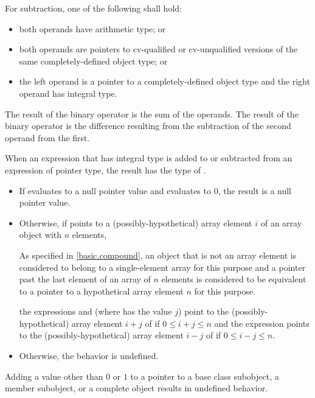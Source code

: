 \pnum
For subtraction, one of the following shall hold:
\begin{itemize}
\item both operands have arithmetic type; or

\item
{}%
both operands are pointers to cv-qualified or cv-unqualified
versions of the same completely-defined object type; or

\item the left operand is a pointer to a completely-defined object type
and the right operand has integral type.
\end{itemize}

\pnum
The result of the binary \tcode{+} operator is the sum of the operands.
The result of the binary \tcode{-} operator is the difference resulting
from the subtraction of the second operand from the first.

\pnum
{}%
When an expression  that has integral type
is added to or subtracted from an expression  of pointer type,
the result has the type of .
\begin{itemize}
\item If  evaluates to a null pointer value and
 evaluates to 0, the result is a null pointer value.
\item Otherwise, if  points to a (possibly-hypothetical) array element $i$
of an array object  with $n$ elements,
\begin{footnote}
As specified in \ref{basic.compound},
an object that is not an array element
is considered to belong to a single-element array for this purpose and
a pointer past the last element of an array of $n$ elements
is considered to be equivalent to a pointer to a hypothetical array element
$n$ for this purpose.
\end{footnote}
the expressions  and 
(where  has the value $j$)
point to the (possibly-hypothetical) array element
$i + j$ of  if $0 \le i + j \le n$
and the expression 
points to the (possibly-hypothetical) array element
$i - j$ of  if $0 \le i - j \le n$.
\item Otherwise, the behavior is undefined.
\end{itemize}
\begin{note}
Adding a value other than $0$ or $1$
to a pointer to a base class subobject, a member subobject,
or a complete object results in undefined behavior.
\end{note}

